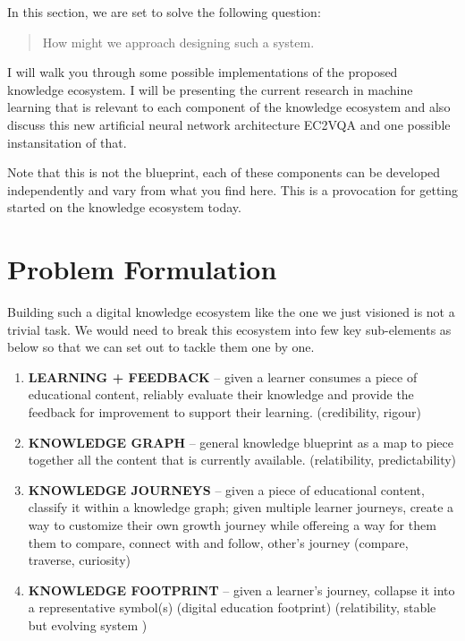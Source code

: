\documentclass[]{book}
\theoremstyle{definition}
\theoremstyle{definition}
\theoremstyle{definition}
\theoremstyle{remark}
\begin{document}
In this section, we are set to solve the following question:

\begin{quote}
How might we approach designing such a system.
\end{quote}

I will walk you through some possible implementations of the proposed
knowledge ecosystem. I will be presenting the current research in
machine learning that is relevant to each component of the knowledge
ecosystem and also discuss this new artificial neural network
architecture EC2VQA and one possible instansitation of that.

Note that this is not the blueprint, each of these components can be
developed independently and vary from what you find here. This is a
provocation for getting started on the knowledge ecosystem today.

\section{Problem Formulation}\label{problem-formulation}

Building such a digital knowledge ecosystem like the one we just
visioned is not a trivial task. We would need to break this ecosystem
into few key sub-elements as below so that we can set out to tackle them
one by one.

\begin{enumerate}
\def\labelenumi{\arabic{enumi}.}
\item
  \textbf{LEARNING + FEEDBACK} -- given a learner consumes a piece of
  educational content, reliably evaluate their knowledge and provide the
  feedback for improvement to support their learning. (credibility,
  rigour)
\item
  \textbf{KNOWLEDGE GRAPH} -- general knowledge blueprint as a map to
  piece together all the content that is currently available.
  (relatibility, predictability)
\item
  \textbf{KNOWLEDGE JOURNEYS} -- given a piece of educational content,
  classify it within a knowledge graph; given multiple learner journeys,
  create a way to customize their own growth journey while offereing a
  way for them them to compare, connect with and follow, other's journey
  (compare, traverse, curiosity)
\item
  \textbf{KNOWLEDGE FOOTPRINT} -- given a learner's journey, collapse it
  into a representative symbol(s) (digital education footprint)
  (relatibility, stable but evolving system )
\end{enumerate}
\end{document}
